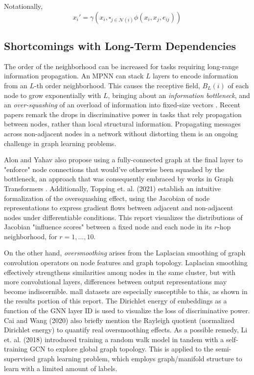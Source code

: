 \documentclass[11pt]{article}
\begin{document}
Notationally,
\begin{equation}
    x_i'=\gamma(x_i, \square_{j\in\mathcal{N}(i)}\phi(x_i, x_j, e_{ij}))
\end{equation}

\subsection{Shortcomings with Long-Term Dependencies}

The order of the neighborhood can be increased for tasks requiring long-range information propagation. An MPNN can stack $L$ layers to encode information from an $L$-th order neighborhood. This causes the receptive field, $B_L(i)$ of each node to grow exponentially with $L$, bringing about an \textit{information bottleneck}, and an \textit{over-squashing} of an overload of information into fixed-size vectors \cite{https://doi.org/10.48550/arxiv.2006.05205}. Recent papers remark the drops in discriminative power in tasks that rely propagation between nodes, rather than local structural information. Propagating messages across non-adjacent nodes in a network without distorting them is an ongoing challenge in graph learning problems.

Alon and Yahav also propose using a fully-connected graph at the final layer \cite{https://doi.org/10.48550/arxiv.2006.05205} to "enforce" node connections that would've otherwise been squashed by the bottleneck, an approach that was consequently embraced by works in Graph Transformers \cite{NEURIPS2021_b4fd1d2c}. Additionally, Topping et. al. (2021) establish an intuitive formalization of the oversquashing effect, using the Jacobian of node representations to express gradient flows between adjacent and non-adjacent nodes under differentiable conditions. This report visualizes the distributions of Jacobian "influence scores" between a fixed node and each node in its $r$-hop neighborhood, for $r=1,...,10$.   

On the other hand, \textit{oversmoothing} arises from the Laplacian smoothing \cite{https://doi.org/10.48550/arxiv.1801.07606} of graph convolution operators on node features and graph topology. Laplacian smoothing effectively strengthens similarities among nodes in the same cluster, but with more convolutional layers, differences between output representations may become indiscernible. mall datasets are especially susceptible to this, as shown in the results portion of this report. The Dirichlet energy of embeddings \cite{https://doi.org/10.48550/arxiv.2006.13318} as a function of the GNN layer ID is used to visualize the loss of discriminative power. Cai and Wang (2020) also briefly mention the Rayleigh quotient (normalized Dirichlet energy) to quantify real oversmoothing effects. As a possible remedy, Li et. al. (2018) introduced training a random walk model in tandem with a self-training GCN to explore global graph topology. This is applied to the semi-supervised graph learning problem, which employs graph/manifold structure to learn with a limited amount of labels. 
\end{document}
